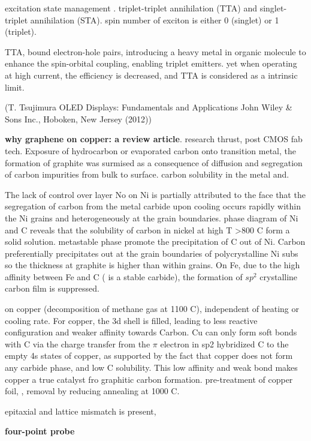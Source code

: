 excitation state management \cite{Zhang2012b}.
triplet-triplet annihilation (TTA) and singlet-triplet annihilation (STA). spin number of exciton is either 0 (singlet) or 1 (triplet).

TTA, bound electron-hole pairs, introducing a heavy metal in organic molecule to enhance the spin-orbital coupling, enabling triplet emitters.\cite{Zhang2013i} yet when operating at high current, the efficiency is decreased, and TTA is considered as a intrinsic limit.


(T. Tsujimura OLED Displays: Fundamentals and Applications John Wiley \& Sons Inc., Hoboken, New Jersey (2012))


\textbf{why graphene on copper: a review article}. \cite{Mattevi2011} research thrust, post CMOS fab tech. Exposure of hydrocarbon or evaporated carbon onto transition metal, the formation of graphite was surmised as a consequence of diffusion and segregation of carbon impurities from bulk to surface. carbon solubility in the metal and. 

The lack of control over layer No on Ni is partially attributed to the face that the segregation of carbon from the metal carbide upon cooling occurs rapidly within the Ni grains and heterogeneously at the grain boundaries. phase diagram of Ni and C reveals that the solubility of carbon in nickel at high T \textgreater 800 C form a solid solution. metastable phase  promote the precipitation of C out of Ni. Carbon preferentially precipitates out at the grain boundaries of polycrystalline Ni subs so the thickness at graphite is higher than within grains. On Fe, due to the high affinity between Fe and C ( is a stable carbide), the formation of $sp^2$ crystalline carbon film is suppressed. 

on copper (decomposition of methane gas at 1100 C), independent of heating or cooling rate. For copper, the 3d shell is filled, leading to less reactive configuration and weaker affinity towards Carbon. Cu can only form soft bonds with C via the charge transfer from the $\pi$ electron in  sp2 hybridized C to the empty 4s states of copper, as supported by the fact that copper does not form any carbide phase, and low C solubility. This low affinity and weak bond makes copper a true catalyst fro graphitic carbon formation. pre-treatment of copper foil, ,  removal by reducing annealing at 1000 C. 

epitaxial and lattice mismatch is present, 

\textbf{four-point probe}

